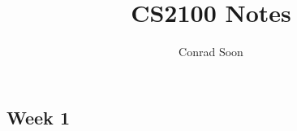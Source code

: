 \documentclass{article}
\title{CS2100 Notes}
\author{Conrad Soon}
\begin{document}
\begin{multicols*}{3}
\maketitle
\section{Week 1}
\end{multicols*}
\end{document}
